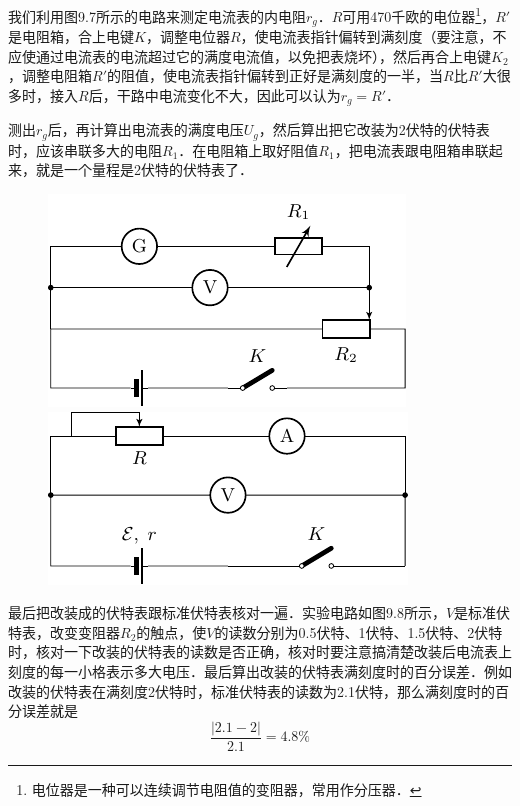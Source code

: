 我们利用图9.7所示的电路来测定电流表的内电阻$r_g$．$R$可用470千欧的电位器\footnote{电位器是一种可以连续调节电阻值的变阻器，常用作分压器．}，$R'$是电阻箱，合上电键$K$，调整电位器$R$，使电流表指针偏转到满刻度（要注意，不应使通过电流表的电流超过它的满度电流值，以免把表烧坏），然后再合上电键$K_2$，调整电阻箱$R'$的阻值，使电流表指针偏转到正好是满刻度的一半，当$R$比$R'$大很多时，接入$R$后，干路中电流变化不大，因此可以认为$r_g=R'$．


测出$r_g$后，再计算出电流表的满度电压$U_g$，然后算出把它改装为2伏特的伏特表时，应该串联多大的电阻$R_1$．在电阻箱上取好阻值$R_1$，把电流表跟电阻箱串联起来，就是一个量程是2伏特的伏特表了．
\begin{figure}[htbp]
    \centering
    \begin{minipage}[t]{0.48\textwidth}
        \centering
        \includegraphics{fig/B/9-8.pdf}
        \caption{}\label{fig_B_9-8}
    \end{minipage}
    \begin{minipage}[t]{0.48\textwidth}
        \centering
        \includegraphics{fig/B/9-9.pdf}
        \caption{}\label{fig_B_9-9}
    \end{minipage}
\end{figure}
    

最后把改装成的伏特表跟标准伏特表核对一遍．实验电路如图9.8所示，$V$是标准伏特表，改变变阻器$R_2$的触点，使$V$的读数分别为0.5伏特、1伏特、1.5伏特、2伏特时，核对一下改装的伏特表的读数是否正确，核对时要注意搞清楚改装后电流表上刻度的每一小格表示多大电压．最后算出改装的伏特表满刻度时的百分误差．例如改装的伏特表在满刻度2伏特时，标准伏特表的读数为2.1伏特，那么满刻度时的百分误差就是
\[\frac{|2.1-2|}{2.1}=4.8\%\]

